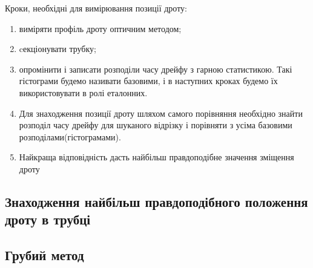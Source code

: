 	

	Кроки, необхідні для вимірювання позиції дроту:
	\begin{enumerate}
	\item виміряти профіль дроту оптичним методом;
	\item cекціонувати трубку;
	\item опромінити і записати розподіли часу дрейфу з гарною статистикою. Такі гістограми будемо називати базовими, і в наступних кроках будемо їх використовувати в ролі еталонних.
	\item Для знаходження позиції дроту шляхом самого порівняння необхідно знайти розподіл часу дрейфу для шуканого відрізку і порівняти з усіма базовими розподілами(гістограмами).
	\item Найкраща відповідність дасть найбільш правдоподібне значення зміщення дроту
	\end{enumerate}

	\subsection{ Знаходження найбільш правдоподібного положення дроту в трубці}
	
	\subsection{Грубий метод}
	
